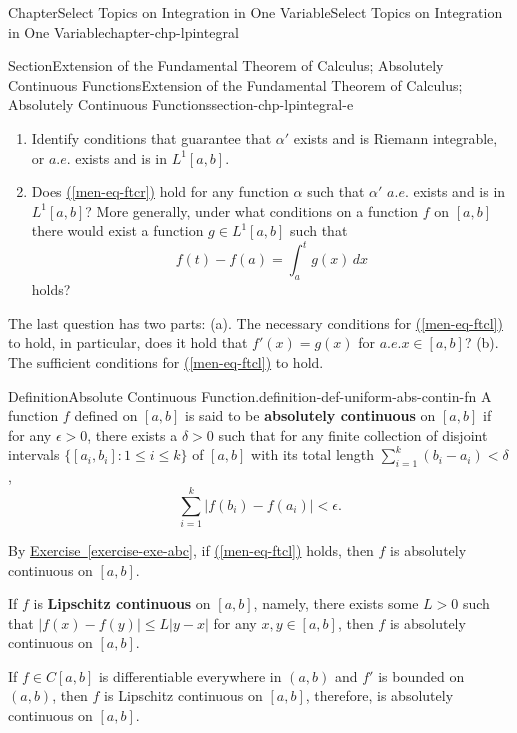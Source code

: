 \documentclass[oneside,10pt,]{book}
\newcommand{\xreffont}{\relax}
\newcommand{\terminology}[1]{\textbf{#1}}
\numberwithin{equation}{section}
\begin{document}
\begin{chapterptx}{Chapter}{Select Topics on Integration in One Variable}{}{Select Topics on Integration in One Variable}{}{}{chapter-chp-lpintegral}
\begin{sectionptx}{Section}{Extension of the Fundamental Theorem of Calculus; Absolutely Continuous Functions}{}{Extension of the Fundamental Theorem of Calculus; Absolutely Continuous Functions}{}{}{section-chp-lpintegral-e}
\begin{introduction}{}
\begin{enumerate}[label=(\Roman*).]
\item{}Identify conditions that guarantee that \(\alpha'\) exists and is Riemann integrable, or \(a.e.\) exists and is in \(L^{1}[a, b]\).%
\item{}Does \hyperref[men-eq-ftcr]{({\xreffont\ref{men-eq-ftcr}})} hold for any function \(\alpha\) such that \(\alpha'\)  \(a.e.\) exists and is in \(L^{1}[a, b]\)? More generally, under what conditions on a function \(f\) on \([a, b]\)  there would exist a function \(g\in L^{1}[a, b]\) such that%
\begin{equation}
f(t)-f(a) =\int_{a}^{t} g(x)\, dx\label{men-eq-ftcl}
\end{equation}
holds?%
\end{enumerate}
 The last question has two parts: (a). The necessary conditions for \hyperref[men-eq-ftcl]{({\xreffont\ref{men-eq-ftcl}})} to hold, in particular, does it hold that \(f'(x)=g(x)\) for \(a.e.\)\(x\in [a, b]\)? (b). The sufficient conditions for  \hyperref[men-eq-ftcl]{({\xreffont\ref{men-eq-ftcl}})} to hold.\end{introduction}%
\begin{definition}{Definition}{Absolute Continuous Function.}{definition-def-uniform-abs-contin-fn}%
A function \(f\) defined  on \([a, b]\) is said to be \terminology{absolutely continuous} on \([a, b]\) if for any \(\epsilon > 0\), there exists a \(\delta > 0\) such that for any finite collection	 of disjoint intervals \(\{[a_{i}, b_{i}]: 1\le i \le k\}\) of \([a, b]\) with its total length \(\sum_{i=1}^{k}(b_{i}-a_{i}) < \delta\),%
\begin{equation}
\sum_{i=1}^{k}|f(b_{i})-f(a_{i})| < \epsilon.\label{men-eq-abcfn}
\end{equation}
%
\end{definition}
By \hyperref[exercise-exe-abc]{Exercise~{\xreffont\ref{exercise-exe-abc}}}, if \hyperref[men-eq-ftcl]{({\xreffont\ref{men-eq-ftcl}})} holds, then \(f\) is absolutely continuous on \([a, b]\).%
\par
If \(f\) is \terminology{Lipschitz continuous} on \([a, b]\), namely, there exists some \(L > 0\) such that \(|f(x)-f(y)|\le L |y-x|\) for any \(x, y\in [a, b]\), then \(f\) is absolutely continuous on \([a, b]\).%
\par
If \(f\in C[a, b]\) is differentiable everywhere in \((a, b)\) and \(f'\) is bounded on \((a, b)\), then \(f\) is Lipschitz continuous on \([a, b]\), therefore, is absolutely continuous on \([a, b]\).%

\end{sectionptx}
\end{chapterptx}
\end{document}
